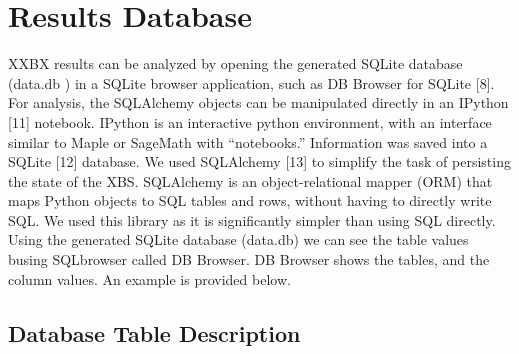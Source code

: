 \documentclass[twoside,11pt]{cergdoc}
\begin{document}
\chapter{Results Database}
XXBX results can be analyzed by
opening the generated SQLite database
(data.db ) in a SQLite browser application,
such as DB Browser for SQLite [8]. For
analysis, the SQLAlchemy objects can be
manipulated directly in an IPython [11]
notebook. IPython is an interactive python
environment, with an interface similar to
Maple or SageMath with “notebooks.”
Information was saved into a SQLite [12]
database.
We used SQLAlchemy [13] to
simplify the task of persisting the state of the
XBS. SQLAlchemy is an object-relational
mapper (ORM) that maps Python objects to
SQL tables and rows, without having to
directly write SQL. We used this library as it
is significantly simpler than using SQL
directly.
Using the generated SQLite database
(data.db) we can see the table values busing
SQLbrowser called DB Browser. DB
Browser shows the tables, and the column
values. An example is provided below.

\begin{appendix}
\chapter{Database Table Description}
\end{appendix}
\end{document}
